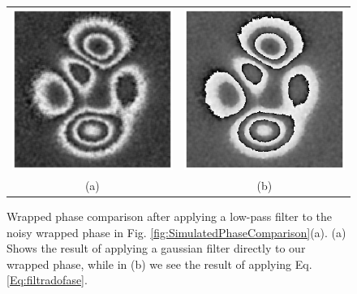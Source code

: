 \begin{figure}[Ht!]
  \begin{center}
    \begin{tabular}{c c }
      \includegraphics[scale=0.45]{Chpt4_figures/Fig_eFaseFiltradaMal.eps}&
      \includegraphics[scale=0.45]{Chpt4_figures/Fig_eFaseFiltrada.eps}\\
      (a) & (b)
    \end{tabular}
  \end{center}
  \caption{ Wrapped phase comparison after applying a low-pass filter to the
  noisy wrapped phase in Fig. \ref{fig:SimulatedPhaseComparison}(a). (a) 
  Shows the result of applying a gaussian filter directly to our wrapped phase,
  while in (b) we see the result of applying Eq. \ref{Eq:filtradofase}.}
  \label{fig:filtradofase}
\end{figure}

